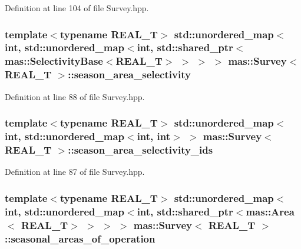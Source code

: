 Definition at line 104 of file Survey.\-hpp.

\hypertarget{structmas_1_1_survey_a7c006caaf702a6288b3c6ff2407af3b1}{
\subsubsection[{season\-\_\-area\-\_\-selectivity}]{\setlength{\rightskip}{0pt plus 5cm}template$<$typename R\-E\-A\-L\-\_\-\-T$>$ std\-::unordered\-\_\-map$<$int, std\-::unordered\-\_\-map$<$int, std\-::shared\-\_\-ptr$<${\bf mas\-::\-Selectivity\-Base}$<$R\-E\-A\-L\-\_\-\-T$>$ $>$ $>$ $>$ {\bf mas\-::\-Survey}$<$ R\-E\-A\-L\-\_\-\-T $>$\-::season\-\_\-area\-\_\-selectivity}}\label{structmas_1_1_survey_a7c006caaf702a6288b3c6ff2407af3b1}


Definition at line 88 of file Survey.\-hpp.

\hypertarget{structmas_1_1_survey_ad34128c8609aa9f7a2d37e8f484bb70b}{
\subsubsection[{season\-\_\-area\-\_\-selectivity\-\_\-ids}]{\setlength{\rightskip}{0pt plus 5cm}template$<$typename R\-E\-A\-L\-\_\-\-T$>$ std\-::unordered\-\_\-map$<$int, std\-::unordered\-\_\-map$<$int, int$>$ $>$ {\bf mas\-::\-Survey}$<$ R\-E\-A\-L\-\_\-\-T $>$\-::season\-\_\-area\-\_\-selectivity\-\_\-ids}}\label{structmas_1_1_survey_ad34128c8609aa9f7a2d37e8f484bb70b}


Definition at line 87 of file Survey.\-hpp.

\hypertarget{structmas_1_1_survey_a6ecd9fe4f0b4d75b3801e6f74ca75029}{
\subsubsection[{seasonal\-\_\-areas\-\_\-of\-\_\-operation}]{\setlength{\rightskip}{0pt plus 5cm}template$<$typename R\-E\-A\-L\-\_\-\-T$>$ std\-::unordered\-\_\-map$<$int, std\-::unordered\-\_\-map$<$int, std\-::shared\-\_\-ptr$<${\bf mas\-::\-Area}$<$ R\-E\-A\-L\-\_\-\-T$>$ $>$ $>$ $>$ {\bf mas\-::\-Survey}$<$ R\-E\-A\-L\-\_\-\-T $>$\-::seasonal\-\_\-areas\-\_\-of\-\_\-operation}}\label{structmas_1_1_survey_a6ecd9fe4f0b4d75b3801e6f74ca75029}


